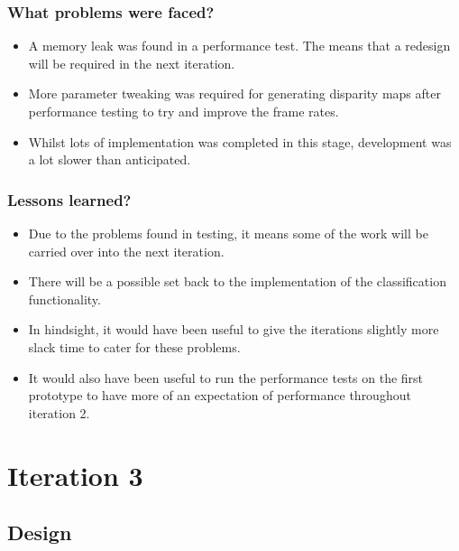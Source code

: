 \documentclass[11pt,oneside]{report}
\begin{document}
			\subsubsection{What problems were faced?}
			\begin{itemize}
				\item A memory leak was found in a performance test. The means that a redesign will be required in the next iteration.
				\item More parameter tweaking was required for generating disparity maps after performance testing to try and improve the frame rates.
				\item Whilst lots of implementation was completed in this stage, development was a lot slower than anticipated.
			\end{itemize}
			
			\subsubsection{Lessons learned?}
			\begin{itemize}
				\item Due to the problems found in testing, it means some of the work will be carried over into the next iteration.
				\item There will be a possible set back to the implementation of the classification functionality.
				\item In hindsight, it would have been useful to give the iterations slightly more slack time to cater for these problems.
				\item It would also have been useful to run the performance tests on the first prototype to have more of an expectation of performance throughout iteration 2.
			\end{itemize}	
			
	\section{Iteration 3}\label{sec:p3}
		\subsection{Design}
\end{document}
